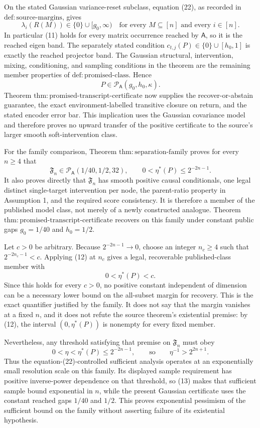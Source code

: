 On the stated Gaussian variance-reset subclass, equation (22), as recorded in \(\mathrm{def{:}source\mbox{-}margins}\), gives
\[
 \lambda_i(R(M))\in\{0\}\cup[g_0,\infty)
 \quad\text{for every }M\subseteq[n]\text{ and every }i\in[n].
 \tag{11}
\]
In particular (11) holds for every matrix occurrence reached by \(\mathsf A\), so it is the reached eigen band.  The separately stated condition \(c_{t,j}(P)\in\{0\}\cup[h_0,1]\) is exactly the reached projector band.  The Gaussian structural, intervention, mixing, conditioning, and sampling conditions in the theorem are the remaining member properties of \(\mathrm{def{:}promised\mbox{-}class}\).  Hence
\[
 P\in\mathcal P_{\mathsf A}(g_0,h_0,\kappa).
\]
Theorem \(\mathrm{thm{:}promised\mbox{-}transcript\mbox{-}certificate}\) now supplies the recover-or-abstain guarantee, the exact environment-labelled transitive closure on return, and the stated encoder error bar.  This implication uses the Gaussian covariance model and therefore proves no upward transfer of the positive certificate to the source's larger smooth soft-intervention class.

For the family comparison, Theorem \(\mathrm{thm{:}separation\mbox{-}family}\) proves for every \(n\ge4\) that
\[
 \mathfrak F_n\in\mathcal P_{\mathsf A}(1/40,1/2,32),
 \qquad
 0<\eta^{\ast}(P)\le2^{-2n-1}.
 \tag{12}
\]
It also proves directly that \(\mathfrak F_n\) has smooth positive causal conditionals, one legal distinct single-target intervention per node, the parent-ratio property in Assumption 1, and the required score consistency.  It is therefore a member of the published model class, not merely of a newly constructed analogue.  Theorem \(\mathrm{thm{:}promised\mbox{-}transcript\mbox{-}certificate}\) recovers on this family under constant public gaps \(g_0=1/40\) and \(h_0=1/2\).

Let \(c>0\) be arbitrary.  Because \(2^{-2n-1}\to0\), choose an integer \(n_c\ge4\) such that \(2^{-2n_c-1}<c\).  Applying (12) at \(n_c\) gives a legal, recoverable published-class member with
\[
 0<\eta^{\ast}(P)<c.
\]
Since this holds for every \(c>0\), no positive constant independent of dimension can be a necessary lower bound on the all-subset margin for recovery.  This is the exact quantifier justified by the family.  It does not say that the margin vanishes at a fixed \(n\), and it does not refute the source theorem's existential premise: by (12), the interval \((0,\eta^{\ast}(P))\) is nonempty for every fixed member.

Nevertheless, any threshold satisfying that premise on \(\mathfrak F_n\) must obey
\[
 0<\eta<\eta^{\ast}(P)\le2^{-2n-1},
 \qquad\text{so}\qquad
 \eta^{-1}>2^{2n+1}.
 \tag{13}
\]
Thus the equation-(22)-controlled sufficient analysis operates at an exponentially small resolution scale on this family.  Its displayed sample requirement has positive inverse-power dependence on that threshold, so (13) makes that sufficient sample bound exponential in \(n\), while the present Gaussian certificate uses the constant reached gaps \(1/40\) and \(1/2\).  This proves exponential pessimism of the sufficient bound on the family without asserting failure of its existential hypothesis.

